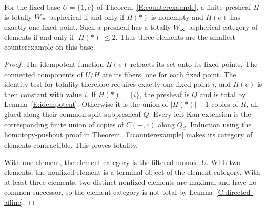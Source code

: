\begin{proposition}\label{E:finite-idempotent-classification}
For the fixed base $U=\{1,e\}$ of Theorem~\ref{E:counterexample}, a finite presheaf $H$ is totally $W_{\infty}$-aspherical if and only if $H(*)$ is nonempty and $H(e)$ has exactly one fixed point. Such a presheaf has a totally $W_{\infty}$-aspherical category of elements if and only if $|H(*)|\leq2$. Thus three elements are the smallest counterexample on this base.
\end{proposition}
\begin{proof}
The idempotent function $H(e)$ retracts its set onto its fixed points. The connected components of $U/H$ are its fibers, one for each fixed point. The identity test for totality therefore requires exactly one fixed point $i$, and $H(e)$ is then constant with value $i$. If $H(*)=\{i\}$, the presheaf is $Q$ and is total by Lemma~\ref{E:idempotent}. Otherwise it is the union of $|H(*)|-1$ copies of $R$, all glued along their common split subpresheaf $Q$. Every left Kan extension is the corresponding finite union of copies of $C(-,c)$ along $Q_d$. Induction using the homotopy-pushout proof in Theorem~\ref{E:counterexample} makes its category of elements contractible. This proves totality.

With one element, the element category is the filtered monoid $U$. With two elements, the nonfixed element is a terminal object of the element category. With at least three elements, two distinct nonfixed elements are maximal and have no common successor, so the element category is not total by Lemma~\ref{C:directed-affine}.
\end{proof}

